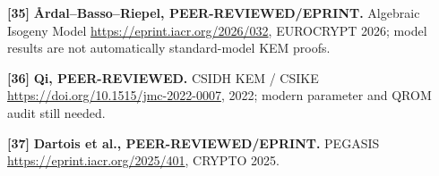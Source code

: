 \documentclass[
  10pt,
  a4paper,
]{article}
\begin{document}
\hypertarget{ref35}{}

\textbf{{[}35{]}} \textbf{Årdal--Basso--Riepel, PEER-REVIEWED/EPRINT.}
Algebraic Isogeny Model \url{https://eprint.iacr.org/2026/032},
EUROCRYPT 2026; model results are not automatically standard-model KEM
proofs.

\hypertarget{ref36}{}

\textbf{{[}36{]}} \textbf{Qi, PEER-REVIEWED.} CSIDH KEM / CSIKE
\url{https://doi.org/10.1515/jmc-2022-0007}, 2022; modern parameter and
QROM audit still needed.

\hypertarget{ref37}{}

\textbf{{[}37{]}} \textbf{Dartois et al., PEER-REVIEWED/EPRINT.} PEGASIS
\url{https://eprint.iacr.org/2025/401}, CRYPTO 2025.

\endgroup
\clearpage\begin{landscape}

\end{landscape}
\end{document}
